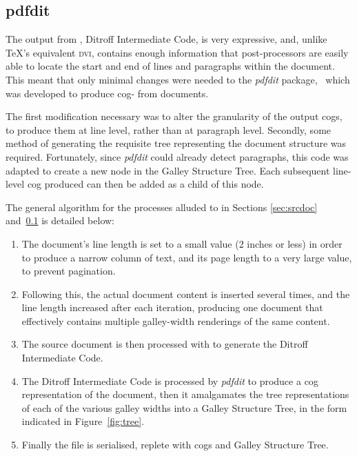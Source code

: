 \subsection{pdfdit}
\label{sec:pdfdit}

The output from \ditroff{}, Ditroff Intermediate Code, is very expressive, and, unlike \TeX's equivalent \textsc{dvi}, contains enough information that post-processors are easily able to locate the start and end of lines and paragraphs within the document. This meant that only minimal changes were needed to the \emph{pdfdit} package,~\cite{Bagley2003} which was developed to produce \gls{cog}-\pdf{} from \troff{} documents.

The first modification necessary was to alter the granularity of the output \gls{cog}s, to produce them at line level, rather than at paragraph level. Secondly, some method of generating the requisite tree representing the document structure was required. Fortunately, since \emph{pdfdit} could already detect paragraphs, this code was adapted to create a new node in the Galley Structure Tree. Each subsequent line-level \gls{cog} produced can then be added as a child of this node.

The general algorithm for the processes alluded to in Sections \ref{sec:srcdoc} and~\ref{sec:pdfdit} is detailed below:
\begin{enumerate}
\item The \troff{} document's line length is set to a small value (2 inches or less) in order to produce a narrow column of text, and its page length to a very large value, to prevent pagination.
\item Following this, the actual document content is inserted several times, and the line length increased after each iteration, producing one document that effectively contains multiple galley-width renderings of the same content.
\item The source document is then processed with \ditroff{} to generate the Ditroff Intermediate Code.
\item The Ditroff Intermediate Code is processed by \emph{pdfdit} to produce a \gls{cog} representation of the document, then it amalgamates the tree representations of each of the various galley widths into a Galley Structure Tree, in the form indicated in Figure~\ref{fig:tree}.
\item Finally the \pdf{} file is serialised, replete with \gls{cog}s and Galley Structure Tree.
\end{enumerate}


